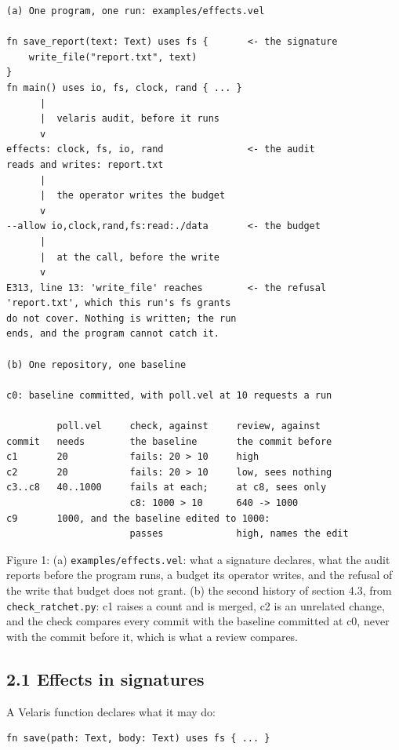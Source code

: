 \documentclass[
]{article}
\begin{document}
\begin{verbatim}
(a) One program, one run: examples/effects.vel

fn save_report(text: Text) uses fs {       <- the signature
    write_file("report.txt", text)
}
fn main() uses io, fs, clock, rand { ... }
      |
      |  velaris audit, before it runs
      v
effects: clock, fs, io, rand               <- the audit
reads and writes: report.txt
      |
      |  the operator writes the budget
      v
--allow io,clock,rand,fs:read:./data       <- the budget
      |
      |  at the call, before the write
      v
E313, line 13: 'write_file' reaches        <- the refusal
'report.txt', which this run's fs grants
do not cover. Nothing is written; the run
ends, and the program cannot catch it.

(b) One repository, one baseline

c0: baseline committed, with poll.vel at 10 requests a run

         poll.vel     check, against     review, against
commit   needs        the baseline       the commit before
c1       20           fails: 20 > 10     high
c2       20           fails: 20 > 10     low, sees nothing
c3..c8   40..1000     fails at each;     at c8, sees only
                      c8: 1000 > 10      640 -> 1000
c9       1000, and the baseline edited to 1000:
                      passes             high, names the edit
\end{verbatim}

Figure 1: (a) \texttt{examples/effects.vel}: what a signature declares,
what the audit reports before the program runs, a budget its operator
writes, and the refusal of the write that budget does not grant. (b) the
second history of section 4.3, from \texttt{check\_ratchet.py}: c1
raises a count and is merged, c2 is an unrelated change, and the check
compares every commit with the baseline committed at c0, never with the
commit before it, which is what a review compares.

\subsection{2.1 Effects in signatures}\label{effects-in-signatures}

A Velaris function declares what it may do:

\begin{verbatim}
fn save(path: Text, body: Text) uses fs { ... }
\end{verbatim}
\end{document}
